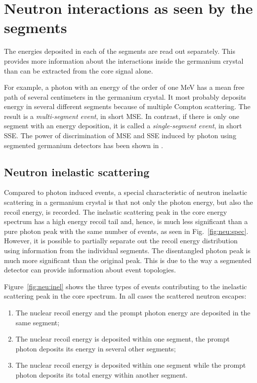 \section{Neutron interactions as seen by the segments}
\label{sec:neu:seg}
The energies deposited in each of the segments are read out
separately. This provides more information about the interactions
inside the germanium crystal than can be extracted from the core
signal alone.

For example, a photon with an energy of the order of one MeV has a
mean free path of several centimeters in the germanium crystal. It
most probably deposits energy in several different segments because of
multiple Compton scattering. The result is a \emph{multi-segment
  event}, in short MSE. In contrast, if there is only one segment with
an energy deposition, it is called a \emph{single-segment event}, in
short SSE. The power of discrimination of MSE and SSE induced by
photon using segmented germanium detectors has been shown in
\cite{Pid07}.

\subsection{Neutron inelastic scattering}
Compared to photon induced events, a special characteristic of neutron inelastic scattering in a germanium crystal is that not only the photon energy, but also the recoil energy, is recorded. The inelastic scattering peak in the core energy spectrum has a high energy recoil tail and, hence, is much less significant than a pure photon peak with the same number of events, as seen in Fig.~\ref{fig:neu:spec}. However, it is possible to partially separate out the recoil energy distribution using information from the individual segments. The disentangled photon peak is much more significant than the original peak. This is due to the way a segmented detector can provide information about event topologies.

Figure~\ref{fig:neu:inel} shows the three types of events contributing to the inelastic scattering peak in the core spectrum. In all cases the scattered neutron escapes:
\begin{enumerate}
\item The nuclear recoil energy and the prompt photon energy are
  deposited in the same segment;
\item The nuclear recoil energy is deposited within one segment, the
  prompt photon deposits its energy in several other segments;
\item The nuclear recoil energy is deposited within one segment while
  the prompt photon deposits its total energy within another segment.
\end{enumerate}


